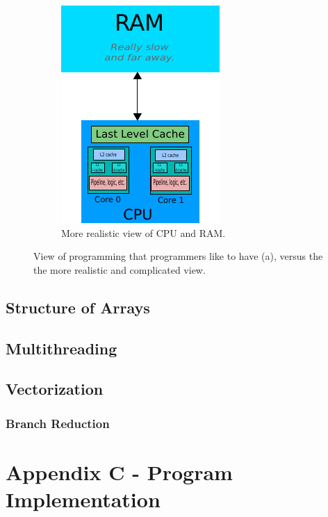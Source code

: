 \documentclass[12pt]{article}
\begin{document}
\begin{figure}[h]
\begin{subfigure}{0.4\textwidth}
\includegraphics[width=\linewidth]{ram-cpu-complex.pdf}
\caption{More realistic view of CPU and RAM.} \label{fig:1b}
\end{subfigure}
\label{fig:cpu-and-ram}
\caption{View of programming that programmers like to have (a), versus the the more realistic
and complicated view.}
\end{figure}


\subsection{Structure of Arrays}

\subsection{Multithreading}

\subsection{Vectorization}
\subsubsection{Branch Reduction}



\section{Appendix C - Program Implementation}
\end{document}
